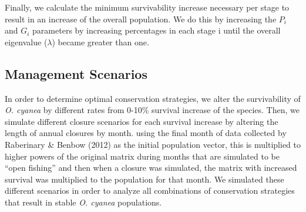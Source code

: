 \documentclass[
]{article}
\begin{document}
Finally, we calculate the minimum survivability increase necessary per stage to result in an increase of the overall population. We do this by increasing the \(P_i\) and \(G_i\) parameters by increasing percentages in each stage i until the overall eigenvalue (\(\lambda\)) became greater than one.

\hypertarget{management-scenarios}{%
\subsection{Management Scenarios}\label{management-scenarios}}

In order to determine optimal conservation strategies, we alter the survivability of \emph{O. cyanea} by different rates from 0-10\% survival increase of the species. Then, we simulate different closure scenarios for each survival increase by altering the length of annual closures by month. using the final month of data collected by Raberinary \& Benbow (2012) as the initial population vector, this is multiplied to higher powers of the original matrix during months that are simulated to be ``open fishing'' and then when a closure was simulated, the matrix with increased survival was multiplied to the population for that month. We simulated these different scenarios in order to analyze all combinations of conservation strategies that result in stable \emph{O. cyanea} populations.

\begin{table}

\caption{\label{tab:LifeHistory}Existing research and information on the per-stage duration of \emph{O. cyanea}. All existing estimates are from Heukelem (1973), Heukelem (1976), Guard \& Mgaya (2003), Humber et al. (2006), Aina (2009). Note: Heukelem (1976) estimate the time to maturity to be 10-13 months (i.e.~stages 1-3 combined). Equations used to estimate metrics from this Lefkovitch Matrix are outlined in Barot et al. (2002). \label{LifeHistory}}
\centering
{}
\end{table}
\end{document}
